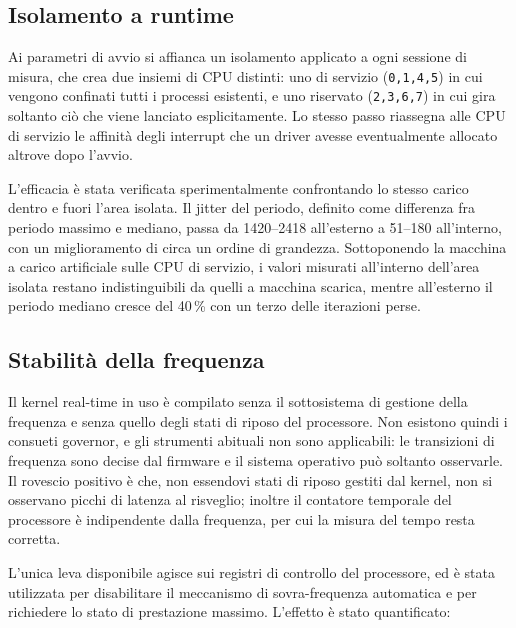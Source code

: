 \subsection{Isolamento a runtime}

Ai parametri di avvio si affianca un isolamento applicato a ogni sessione di misura, che crea due
insiemi di CPU distinti: uno di servizio (\texttt{0,1,4,5}) in cui vengono confinati tutti i
processi esistenti, e uno riservato (\texttt{2,3,6,7}) in cui gira soltanto ci\`o che viene
lanciato esplicitamente. Lo stesso passo riassegna alle CPU di servizio le affinit\`a degli
interrupt che un driver avesse eventualmente allocato altrove dopo l'avvio.

L'efficacia \`e stata verificata sperimentalmente confrontando lo stesso carico dentro e fuori
l'area isolata. Il jitter del periodo, definito come differenza fra periodo massimo e mediano,
passa da 1420--2418\us{} all'esterno a 51--180\us{} all'interno, con un miglioramento di circa un
ordine di grandezza. Sottoponendo la macchina a carico artificiale sulle CPU di servizio, i valori
misurati all'interno dell'area isolata restano indistinguibili da quelli a macchina scarica,
mentre all'esterno il periodo mediano cresce del 40\,\% con un terzo delle iterazioni perse.

\subsection{Stabilit\`a della frequenza}

Il kernel real-time in uso \`e compilato senza il sottosistema di gestione della frequenza e senza
quello degli stati di riposo del processore. Non esistono quindi i consueti governor, e gli
strumenti abituali non sono applicabili: le transizioni di frequenza sono decise dal firmware e il
sistema operativo pu\`o soltanto osservarle. Il rovescio positivo \`e che, non essendovi stati di
riposo gestiti dal kernel, non si osservano picchi di latenza al risveglio; inoltre il contatore
temporale del processore \`e indipendente dalla frequenza, per cui la misura del tempo resta
corretta.

L'unica leva disponibile agisce sui registri di controllo del processore, ed \`e stata utilizzata
per disabilitare il meccanismo di sovra-frequenza automatica e per richiedere lo stato di
prestazione massimo. L'effetto \`e stato quantificato:

